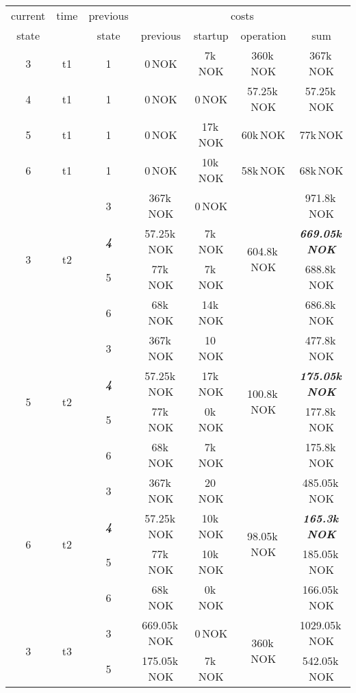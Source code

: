 \documentclass{article}
\begin{document}
	\begin{table}[hbt!]
\begin{center}
\begin{tabular}[h]{|c|c|c||c|c|c||c|}
\hline
current & time & previous   & \multicolumn{4}{|c|}{costs}\\
\cline{4-7}
state  		&      	&  state    &   previous    	&    startup   		& operation 		&  sum \\
\hline
\hline
 3			&	t1	&	1		&		0\,NOK		&	7k\,NOK			&	360k\,NOK		& 367k\,NOK\\
\hline
 4			&	t1	&	1		&		0\,NOK		&	0\,NOK			&	57.25k\,NOK		& 57.25k\,NOK\\
\hline
 5			&	t1	&	1		&		0\,NOK		&	17k\,NOK		&	60k\,NOK		& 77k\,NOK\\
\hline
 6			&	t1	&	1		&		0\,NOK		&	10k\,NOK		&	58k\,NOK		& 68k\,NOK\\
\hline
\hline
\multirow{4}{*}{3} & \multirow{4}{*}{t2} 
	&	3		&		367k\,NOK	&	0\,NOK			&	\multirow{4}{*}{604.8k\,NOK}		&	971.8k\,NOK\\
&	&	\textit{\textbf{4}}		&		57.25k\,NOK	&	7k\,NOK			&					&	\textit{\textbf{669.05k\,NOK}}\\
&	&	5		&		77k\,NOK	&	7k\,NOK			&										&	688.8k\,NOK\\
&	&	6		&		68k\,NOK	&	14k\,NOK		&										&	686.8k\,NOK\\
\hline
\multirow{4}{*}{5} & \multirow{4}{*}{t2}	
	&	3		&		367k\,NOK	&	10\,NOK			&	\multirow{4}{*}{100.8k\,NOK}		&	477.8k\,NOK\\
&	&	\textit{\textbf{4}}		&		57.25k\,NOK	&	17k\,NOK		&					&	\textit{\textbf{175.05k\,NOK}}\\
&	&	5		&		77k\,NOK	&	0k\,NOK			&										&	177.8k\,NOK\\
&	&	6		&		68k\,NOK	&	7k\,NOK			&										&	175.8k\,NOK\\
\hline
\multirow{4}{*}{6} & \multirow{4}{*}{t2}	
	&	3		&		367k\,NOK	&	20\,NOK			&	\multirow{4}{*}{98.05k\,NOK}		&	485.05k\,NOK\\
&	&	\textit{\textbf{4}}		&		57.25k\,NOK	&	10k\,NOK		&					&	\textit{\textbf{165.3k\,NOK}}\\
&	&	5		&		77k\,NOK	&	10k\,NOK		&										&	185.05k\,NOK\\
&	&	6		&		68k\,NOK	&	0k\,NOK			&										&	166.05k\,NOK\\
\hline
\hline
\multirow{3}{*}{3} & \multirow{3}{*}{t3}	
	&	3		&		669.05k\,NOK	&	0\,NOK			&	\multirow{3}{*}{360k\,NOK}			&	1029.05k\,NOK\\
&	&	5		&		175.05k\,NOK	&	7k\,NOK			&										&	542.05k\,NOK\\

\end{tabular}
\end{center}
\end{table}
\end{document}
